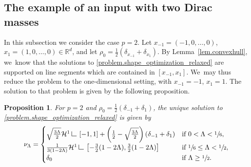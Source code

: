 \documentclass[10pt]{amsart}
\newtheorem{proposition}[theorem]{Proposition}
\theoremstyle{definition}
\newcommand\LM[1]{\hbox{\vrule width.5pt \vbox to#1pt{\vfill \hrule width#1pt height.5pt}}}
\newcommand\LL{{\mathchoice {\>\LM7\>}{\>\LM7\>}{\,\LM5\,}{\,\LM{3.35}\,}}}
\newcommand{\mres}{\LL}
\newcommand\cH{\mathcal{H}}
\newcommand{\RR}{\mathbb{R}}
\newcommand{\ci}[2]{ \left[ #1, #2 \right] }
\begin{document}
\subsection{The example of an input with two Dirac masses}
In this subsection we consider the case $p=2$. Let $x_{-1}=(-1,0,\ldots, 0)$, $x_{1}=(1,0,\ldots,0) \in \RR^d$, and let $\rho_0=\frac{1}{2}\left(\delta_{x_{-1}}+\delta_{x_{1}}\right)$. By Lemma~\ref{lem.convexhull}, we~know that the solutions to \eqref{problem.shape_optimization_relaxed} are supported on line segments which are contained in $\ci{x_{-1}}{x_1}$. We~may thus reduce the problem to the one-dimensional setting, with $x_{-1}=-1$, $x_{1}=1$. The solution to that problem is given by the following proposition.

\begin{proposition}
For $p=2$ and $\rho_0=\frac{1}{2}\left(\delta_{-1}+\delta_{1}\right)$, the unique solution to \eqref{problem.shape_optimization_relaxed} is given by
\begin{align}
\nu_\Lambda = \begin{cases}
\sqrt{\frac{3\Lambda}{2}}\cH^1\mres\ci{-1}{1} + \left(\frac{1}{2}-\sqrt{\frac{3\Lambda}{2}}\right)(\delta_{-1}+\delta_1) & \mbox{if $0<\Lambda<\sfrac{1}{6}$},\\
\frac{1}{3(1-2\Lambda)}\cH^1\mres\ci{-\frac{3}{2}(1-2\Lambda)}{\frac{3}{2}(1-2\Lambda)} &\mbox{if $\sfrac{1}{6}\le \Lambda <\sfrac{1}{2}$},\\
\delta_0 & \mbox{if $\Lambda\geq \sfrac{1}{2}$}.
\end{cases} \label{eq:}
\end{align}
\end{proposition}
\end{document}
